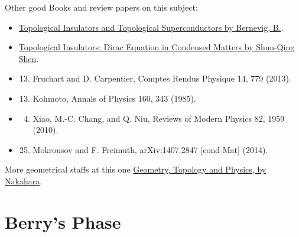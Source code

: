 \documentclass[letterpaper,10pt,english]{sphinxmanual}
\begin{document}
Other good Books and review papers on this subject:
\begin{itemize}
\item {} 
\href{http://www.amazon.com/Topological-Insulators-Superconductors-Andrei-Bernevig/dp/069115175X}{Topological Insulators and Topological Superconductors by Bernevig, B.}.

\item {} 
\href{http://www.amazon.com/Topological-Insulators-Equation-Condensed-Solid-State/dp/3642328571/ref=sr\_1\_2?s=books\&ie=UTF8\&qid=1415444346\&sr=1-2\&keywords=Topological+Insulators}{Topological Insulators: Dirac Equation in Condensed Matters by Shun-Qing Shen}.

\item {} \begin{enumerate}
\setcounter{enumi}{12}
\item {} 
Fruchart and D. Carpentier, Comptes Rendus Physique 14, 779 (2013).

\end{enumerate}

\item {} \begin{enumerate}
\setcounter{enumi}{12}
\item {} 
Kohmoto, Annals of Physics 160, 343 (1985).

\end{enumerate}

\item {} \begin{enumerate}
\setcounter{enumi}{3}
\item {} 
Xiao, M.-C. Chang, and Q. Niu, Reviews of Modern Physics 82, 1959 (2010).

\end{enumerate}

\item {} \begin{enumerate}
\setcounter{enumi}{24}
\item {} 
Mokrousov and F. Freimuth, arXiv:1407.2847 {[}cond-Mat{]} (2014).

\end{enumerate}

\end{itemize}

More geometrical staffs at this one \href{http://www.amazon.com/Geometry-Topology-Physics-Edition-Graduate/dp/0750306068}{Geometry, Topology and Physics, by Nakahara}.


\section{Berry's Phase}
\label{TI/Berry's Phase/main:id1}\label{TI/Berry's Phase/main::doc}\label{TI/Berry's Phase/main:berry-s-phase}
\end{document}
